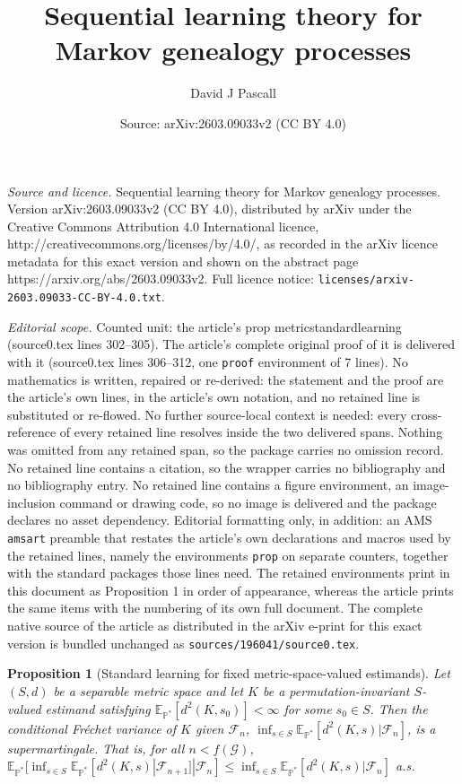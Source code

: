 \documentclass[10pt,a4paper]{amsart}
\title{Sequential learning theory for Markov genealogy processes}
\author{David J Pascall}
\date{Source: arXiv:2603.09033v2 (CC BY 4.0)}
\newtheorem{prop}{Proposition}
\begin{document}
\maketitle

\noindent\emph{Source and licence.} Sequential learning theory for Markov genealogy processes. Version arXiv:2603.09033v2 (CC BY 4.0), distributed by arXiv under the Creative Commons Attribution 4.0 International licence, http://creativecommons.org/licenses/by/4.0/, as recorded in the arXiv licence metadata for this exact version and shown on the abstract page https://arxiv.org/abs/2603.09033v2. Full licence notice: \texttt{licenses/arxiv-2603.09033-CC-BY-4.0.txt}.\par\smallskip

\noindent\textit{Editorial scope.} Counted unit: the article's prop metricstandardlearning (source0.tex lines 302--305). The article's complete original proof of it is delivered with it (source0.tex lines 306--312, one \texttt{proof} environment of 7 lines). No mathematics is written, repaired or re-derived: the statement and the proof are the article's own lines, in the article's own notation, and no retained line is substituted or re-flowed.  No further source-local context is needed: every cross-reference of every retained line resolves inside the two delivered spans.  Nothing was omitted from any retained span, so the package carries no omission record.  No retained line contains a citation, so the wrapper carries no bibliography and no bibliography entry.  No retained line contains a figure environment, an image-inclusion command or drawing code, so no image is delivered and the package declares no asset dependency.  Editorial formatting only, in addition: an AMS \texttt{amsart} preamble that restates the article's own declarations and macros used by the retained lines, namely the environments \texttt{prop} on separate counters, together with the standard packages those lines need.  The retained environments print in this document as Proposition 1 in order of appearance, whereas the article prints the same items with the numbering of its own full document.  The complete native source of the article as distributed in the arXiv e-print for this exact version is bundled unchanged as \texttt{sources/196041/source0.tex}.
\begin{prop}[Standard learning for fixed metric-space-valued estimands]
\label{metricstandardlearning}
Let $(S,d)$ be a separable metric space and let $K$ be a permutation-invariant $S$-valued estimand satisfying $\mathbb{E}_{\mathbb{P}^*}[d^2(K,s_0)]<\infty$ for some $s_0 \in S$. Then the conditional Fr\'{e}chet variance of $K$ given $\mathcal{F}_n$, $\inf_{s \in S} \mathbb{E}_{\mathbb{P}^*}[d^2(K,s)|\mathcal{F}_n]$, is a supermartingale. That is, for all $n < f(\mathcal{G})$, $\mathbb{E}_{\mathbb{P}^*}[\inf_{s \in S} \mathbb{E}_{\mathbb{P}^*}[d^2(K,s)|\mathcal{F}_{n+1}]|\mathcal{F}_n] \leq \inf_{s \in S} \mathbb{E}_{\mathbb{P}^*}[d^2(K,s)|\mathcal{F}_n]$ a.s.
\end{prop}
\end{document}
